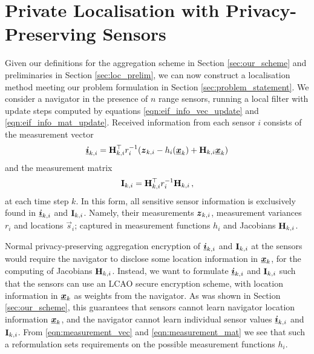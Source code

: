 \documentclass[twocolumn]{autart}
\begin{document}
% 
%                                                                
%                                                                
%                                                                
% 

\section{Private Localisation with Privacy-Preserving Sensors} \label{sec:private_localisation}
Given our definitions for the aggregation scheme in Section \ref{sec:our_scheme} and preliminaries in Section \ref{sec:loc_prelim}, we can now construct a localisation method meeting our problem formulation in Section \ref{sec:problem_statement}. We consider a navigator in the presence of $n$ range sensors, running a local filter with update steps computed by equations \eqref{eqn:eif_info_vec_update} and \eqref{eqn:eif_info_mat_update}. Received information from each sensor $i$ consists of the measurement vector
\begin{equation}
    {\boldsymbol{\underline{i}}}_{k,i} = {{\mathbf{H}}}^\top_{k,i} r^{-1}_i ({\boldsymbol{z}}_{k,i} - h_i({\boldsymbol{\underline{x}}}_k) + {{\mathbf{H}}}_{k,i}{\boldsymbol{\underline{x}}}_k) \label{eqn:measurement_vec}
\end{equation}
and the measurement matrix
\begin{equation}
    {\ensuremath{{\mathbf{I}}}}_{k,i} = {{\mathbf{H}}}^\top_{k,i} r^{-1}_i {{\mathbf{H}}}_{k,i}\,, \label{eqn:measurement_mat}
\end{equation}
at each time step $k$. In this form, all sensitive sensor information is exclusively found in ${\boldsymbol{\underline{i}}}_{k,i}$ and ${{\mathbf{I}}}_{k,i}$. Namely, their measurements ${\boldsymbol{z}}_{k,i}$, measurement variances $r_i$ and locations $\vec{s}_i$; captured in measurement functions $h_i$ and Jacobians ${{\mathbf{H}}}_{k,i}$. 

Normal privacy-preserving aggregation encryption of ${\boldsymbol{\underline{i}}}_{k,i}$ and ${{\mathbf{I}}}_{k,i}$ at the sensors would require the navigator to disclose some location information in ${\boldsymbol{\underline{x}}}_k$, for the computing of Jacobians ${{\mathbf{H}}}_{k,i}$. Instead, we want to formulate ${\boldsymbol{\underline{i}}}_{k,i}$ and ${{\mathbf{I}}}_{k,i}$ such that the sensors can use an LCAO secure encryption scheme, with location information in ${\boldsymbol{\underline{x}}}_k$ as weights from the navigator. As was shown in Section \ref{sec:our_scheme}, this guarantees that sensors cannot learn navigator location information ${\boldsymbol{\underline{x}}}_k$, and the navigator cannot learn individual sensor values ${\boldsymbol{\underline{i}}}_{k,i}$ and ${{\mathbf{I}}}_{k,i}$. From \eqref{eqn:measurement_vec} and \eqref{eqn:measurement_mat} we see that such a reformulation sets requirements on the possible measurement functions $h_i$. 
\end{document}
